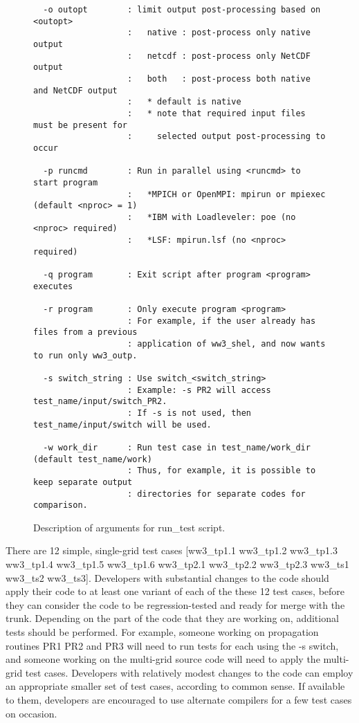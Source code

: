 \documentclass[12pt]{article}
\newcommand{\file}{\sf}
\newcounter{myfigno}[section]
\newenvironment{myfig}[1]{\begin{figure}[#1]
                         \refstepcounter{myfigno}}                       
                        {\end{figure}}
\newcommand{\myfcap}[1]{\begin{list}{\ff Fig. \themyfigno\ :~\hfill}
                       {\rightmargin 8mm \labelsep 0mm
                        \labelwidth 8mm \leftmargin 8mm
                        \topsep 0mm \parskip 0mm \partopsep 0mm }
                        \item \ff #1 \end{list}}
\renewcommand{\themyfigno}{\thesection.\arabic{myfigno}}
\begin{document}
\begin{myfig}{tbp}
\begin{center}
\begin{minipage}[c]{4.5in}
{\begin{verbatim}
  -o outopt        : limit output post-processing based on <outopt>
                   :   native : post-process only native output
                   :   netcdf : post-process only NetCDF output
                   :   both   : post-process both native and NetCDF output
                   :   * default is native
                   :   * note that required input files must be present for
                   :     selected output post-processing to occur

  -p runcmd        : Run in parallel using <runcmd> to start program
                   :   *MPICH or OpenMPI: mpirun or mpiexec (default <nproc> = 1)
                   :   *IBM with Loadleveler: poe (no <nproc> required)
                   :   *LSF: mpirun.lsf (no <nproc> required)

  -q program       : Exit script after program <program> executes

  -r program       : Only execute program <program>
                   : For example, if the user already has files from a previous
                   : application of ww3_shel, and now wants to run only ww3_outp.

  -s switch_string : Use switch_<switch_string>
                   : Example: -s PR2 will access test_name/input/switch_PR2.
                   : If -s is not used, then test_name/input/switch will be used.

  -w work_dir      : Run test case in test_name/work_dir (default test_name/work)
                   : Thus, for example, it is possible to keep separate output
                   : directories for separate codes for comparison.

\end{verbatim}}
\end{minipage}
\end{center}
\myfcap{Description of arguments for {\file run\_test} script.}
\label{fig:run_test}
\end{myfig}

There are 12 simple, single-grid test cases [{\file ww3\_tp1.1 ww3\_tp1.2 ww3\_tp1.3
ww3\_tp1.4 ww3\_tp1.5 ww3\_tp1.6 ww3\_tp2.1 ww3\_tp2.2 ww3\_tp2.3 ww3\_ts1
ww3\_ts2 ww3\_ts3}]. Developers with substantial changes to the code should
apply their code to at least one variant of each of the these 12 test cases,
before they can consider the code to be regression-tested and ready for merge
with the trunk. Depending on the part of the code that they are working on,
additional tests should be performed. For example, someone working on
propagation routines PR1 PR2 and PR3 will need to run tests for each using the
-s switch, and someone working on the multi-grid source code will need to
apply the multi-grid test cases. Developers with relatively modest changes
to the code can employ an appropriate smaller set of test cases, according
to common sense. If available to them, developers are encouraged to use alternate
compilers for a few test cases on occasion.
\end{document}

